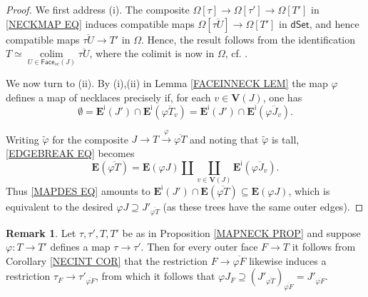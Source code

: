 \documentclass[a4paper,10pt
,draft
]{article}%
\numberwithin{equation}{section}
\numberwithin{figure}{section}
\theoremstyle{definition} %
\newtheorem{remark}[equation]{Remark}%
\DeclareMathOperator{\colim}{colim}%
\newcommand{\1}{\ensuremath{\mathbbm 1}}%
\begin{document}
\begin{proof}
	We first address (i).
	The composite
	$\Omega[\tau] \to 
	\Omega[\tau'] \to 
	\Omega[T']$
	in \eqref{NECKMAP EQ}
	induces compatible maps
	$\Omega[\overline{\tau U}] \to \Omega[T']$
	in $\mathsf{dSet}$,
	and hence 
	compatible maps
	$\overline{\tau U} \to T'$ 
	in $\Omega$.
	Hence, the result follows from the identification
	$T
	\simeq  
	\underset{U \in \mathsf{Face}_{sc}(J)}{\colim}
	\overline{\tau U}$, where the colimit is now in $\Omega$,
	cf. \cite[Cor. 3.70]{BP_geo}.
	
	We now turn to (ii).
	By (i),(ii) in Lemma \ref{FACEINNECK LEM}
	the map $\varphi$ defines a map of necklaces 
	precisely if, 
	for each $v \in \boldsymbol{V}(J)$, one has
	\begin{equation}\label{MAPDES EQ}
	\emptyset
	=
	\boldsymbol{E}^{\mathsf{i}}(J')
	\cap
	\boldsymbol{E}^{\mathsf{i}}(\overline{ \varphi T_v})
	=
	\boldsymbol{E}^{\mathsf{i}}(J')
	\cap
	\boldsymbol{E}^{\mathsf{i}}(\overline{ \varphi J_v}).
	\end{equation}
	
	Writing $\tilde{\varphi}$ for the composite
	$
	J \to T \xrightarrow{\varphi} \overline{\varphi T}
	$
	and noting that $\tilde{\varphi}$ is tall,
	\eqref{EDGEBREAK EQ} becomes 
	\begin{equation}\label{DECOMPPR EQ}
	\boldsymbol{E}(\overline{\varphi T})
	=
	\boldsymbol{E}(\varphi J)
	\amalg
	\coprod_{v \in \boldsymbol{V}(J)}
	\boldsymbol{E}^{\mathsf{i}}(\overline{\varphi J_v}).
	\end{equation}
	Thus \eqref{MAPDES EQ}
	amounts to
	$\boldsymbol{E}^{\mathsf{i}}(J') \cap 
	\boldsymbol{E}(\overline{\varphi T})
	\subseteq
	\boldsymbol{E}(\varphi J)$,
	which is equivalent to the desired
	$\varphi J \supseteq J'_{\overline{\varphi T}}$
	(as these trees have the same outer edges).
\end{proof}



\begin{remark}\label{NECKMAPCHAR REM}
	Let $\tau,\tau',T,T'$ be as in
	Proposition \ref{MAPNECK PROP}
	and suppose 
	$\varphi \colon T \to T'$
	defines a map
	$\tau \to \tau'$.
	Then for every outer face $F \to T$
	it follows from 
	Corollary \ref{NECINT COR}
	that the restriction 
	$F \to \overline{\varphi F}$
	likewise induces a restriction
	$\tau_F \to \tau'_{\overline{\varphi F}}$,
	from which it follows that
	$\varphi J_F \supseteq 
	\left(J'_{\overline{\varphi T}}\right)_{\overline{\varphi F}}
	=
	J'_{\overline{\varphi F}}$.
\end{remark}
\end{document}
